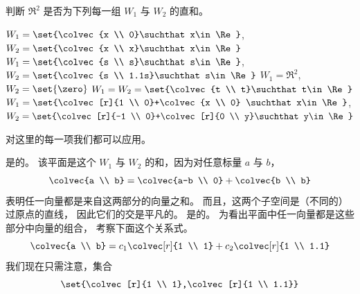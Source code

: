 \begin{exercises}
  \recommended \item
    判断 \( \Re^2 \) 是否为下列每一组 \( W_1 \) 与 \( W_2 \) 的直和。
    \begin{exparts}
       \partsitem \( W_1=\set{\colvec{x \\ 0}\suchthat x\in\Re} \),
             \( W_2=\set{\colvec{x \\ x}\suchthat x\in\Re} \)
       \partsitem \( W_1=\set{\colvec{s \\ s}\suchthat s\in\Re} \),
             \( W_2=\set{\colvec{s \\ 1.1s}\suchthat s\in\Re} \)
       \partsitem \( W_1=\Re^2 \), \( W_2=\set{\zero} \)
       \partsitem \( W_1=W_2=\set{\colvec{t \\ t}\suchthat t\in\Re} \)
       \partsitem \( W_1=\set{\colvec[r]{1 \\ 0}+\colvec{x \\ 0}
                                \suchthat x\in\Re} \),
             \( W_2=\set{\colvec[r]{-1 \\ 0}+\colvec[r]{0 \\ y}\suchthat y\in\Re} \)
    \end{exparts}
    \begin{answer}
       对这里的每一项我们都可以应用。
       \begin{exparts}
         \partsitem 是的。
           该平面是这个 $W_1$ 与 $W_2$ 的和，因为对任意标量 $a$ 与 $b$，
           \begin{equation*}
             \colvec{a \\ b}
             =\colvec{a-b \\ 0}
             +\colvec{b \\ b}
           \end{equation*}
           表明任一向量都是来自这两部分的向量之和。
           而且，这两个子空间是（不同的）过原点的直线，
           因此它们的交是平凡的。
         \partsitem 是的。
           为看出平面中任一向量都是这些部分中向量的组合，
           考察下面这个关系式。
           \begin{equation*}
             \colvec{a \\ b}=c_1\colvec[r]{1 \\ 1}+c_2\colvec[r]{1 \\ 1.1}
           \end{equation*}
           我们现在只需注意，集合
           \begin{equation*}
             \set{\colvec[r]{1 \\ 1},\colvec[r]{1 \\ 1.1}}

\end{equation*}
\end{exparts}
\end{answer}
\end{exercises}
